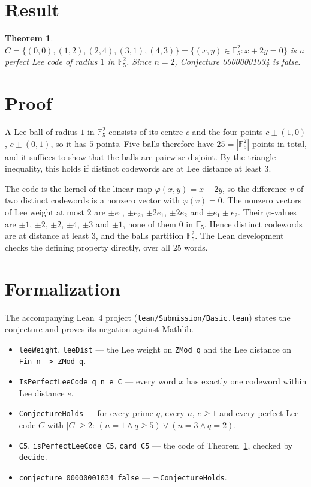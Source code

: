 \documentclass[11pt]{article}
\theoremstyle{plain}
\newtheorem{theorem}{Theorem}
\theoremstyle{definition}
\theoremstyle{remark}
\newcommand{\F}{\mathbb F}
\begin{document}
\section{Result}

\begin{theorem}\label{thm:main}
$C=\{(0,0),(1,2),(2,4),(3,1),(4,3)\}=\{(x,y)\in\F_5^2:x+2y=0\}$ is a perfect Lee
code of radius $1$ in $\F_5^2$. Since $n=2$, Conjecture 00000001034 is false.
\end{theorem}

\section{Proof}

A Lee ball of radius $1$ in $\F_5^2$ consists of its centre $c$ and the four
points $c\pm(1,0)$, $c\pm(0,1)$, so it has $5$ points. Five balls therefore have
$25=|\F_5^2|$ points in total, and it suffices to show that the balls are
pairwise disjoint. By the triangle inequality, this holds if distinct codewords
are at Lee distance at least $3$.

The code is the kernel of the linear map $\varphi(x,y)=x+2y$, so the difference
$v$ of two distinct codewords is a nonzero vector with $\varphi(v)=0$. The
nonzero vectors of Lee weight at most $2$ are $\pm e_1$, $\pm e_2$, $\pm2e_1$,
$\pm2e_2$ and $\pm e_1\pm e_2$. Their $\varphi$-values are $\pm1$, $\pm2$,
$\pm2$, $\pm4$, $\pm3$ and $\pm1$, none of them $0$ in $\F_5$. Hence distinct
codewords are at distance at least $3$, and the balls partition $\F_5^2$. The
Lean development checks the defining property directly, over all $25$ words.

\section{Formalization}

The accompanying Lean~4 project (\texttt{lean/Submission/Basic.lean}) states
the conjecture and proves its negation against Mathlib.

\begin{itemize}
  \item \texttt{leeWeight}, \texttt{leeDist} --- the Lee weight on
    \texttt{ZMod q} and the Lee distance on \texttt{Fin n -> ZMod q}.
  \item \texttt{IsPerfectLeeCode q n e C} --- every word $x$ has exactly one
    codeword within Lee distance $e$.
  \item \texttt{ConjectureHolds} --- for every prime $q$, every $n$, $e\ge1$
    and every perfect Lee code $C$ with $|C|\ge2$: $(n=1\wedge q\ge5)\vee(n=3
    \wedge q=2)$.
  \item \texttt{C5}, \texttt{isPerfectLeeCode\_C5}, \texttt{card\_C5} --- the
    code of Theorem~\ref{thm:main}, checked by \texttt{decide}.
  \item \texttt{conjecture\_00000001034\_false} ---
    $\lnot\,$\texttt{ConjectureHolds}.
\end{itemize}
\end{document}
